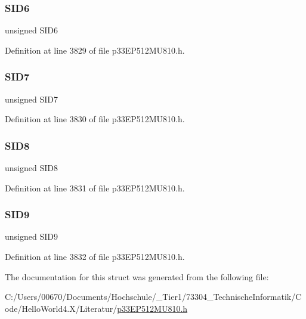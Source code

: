 \subsubsection{\texorpdfstring{S\+I\+D6}{SID6}}
{\footnotesize\ttfamily unsigned S\+I\+D6}



Definition at line 3829 of file p33\+E\+P512\+M\+U810.\+h.

\mbox{\label{structtag_c1_r_x_f2_s_i_d_b_i_t_s_a34097fb76decd431701fa2d86a22328e}} 
\subsubsection{\texorpdfstring{S\+I\+D7}{SID7}}
{\footnotesize\ttfamily unsigned S\+I\+D7}



Definition at line 3830 of file p33\+E\+P512\+M\+U810.\+h.

\mbox{\label{structtag_c1_r_x_f2_s_i_d_b_i_t_s_afe74894633244fdb0b0c01b4e8c522e7}} 
\subsubsection{\texorpdfstring{S\+I\+D8}{SID8}}
{\footnotesize\ttfamily unsigned S\+I\+D8}



Definition at line 3831 of file p33\+E\+P512\+M\+U810.\+h.

\mbox{\label{structtag_c1_r_x_f2_s_i_d_b_i_t_s_a33587704948067005c2a6a3ccc503c99}} 
\subsubsection{\texorpdfstring{S\+I\+D9}{SID9}}
{\footnotesize\ttfamily unsigned S\+I\+D9}



Definition at line 3832 of file p33\+E\+P512\+M\+U810.\+h.



The documentation for this struct was generated from the following file\+:\begin{DoxyCompactItemize}
\item 
C\+:/\+Users/00670/\+Documents/\+Hochschule/\+\_\+\+Tier1/73304\+\_\+\+Technische\+Informatik/\+Code/\+Hello\+World4.\+X/\+Literatur/\hyperlink{p33_e_p512_m_u810_8h}{p33\+E\+P512\+M\+U810.\+h}\end{DoxyCompactItemize}
